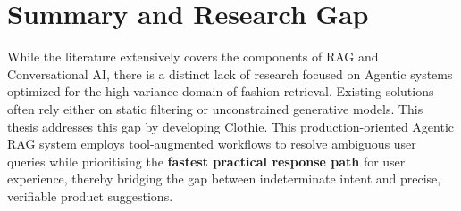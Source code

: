 \section{Summary and Research Gap}

While the literature extensively covers the components of RAG and Conversational AI, there is a distinct lack of research focused on Agentic systems optimized for the high-variance domain of fashion retrieval. Existing solutions often rely either on static filtering or unconstrained generative models. This thesis addresses this gap by developing Clothie. This production-oriented Agentic RAG system employs tool-augmented workflows to resolve ambiguous user queries while prioritising the \textbf{fastest practical response path} for user experience, thereby bridging the gap between indeterminate intent and precise, verifiable product suggestions.